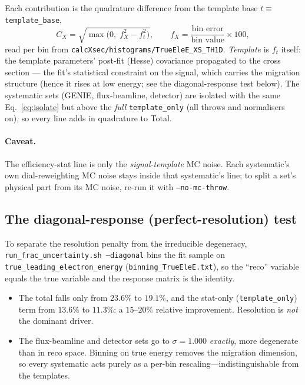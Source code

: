 \documentclass[11pt]{article}
\newcommand{\code}[1]{\texttt{#1}}
\begin{document}
Each contribution is the quadrature difference from the template base
$t \equiv$ \code{template\_base},
\begin{equation}
  C_X = \sqrt{\max\!\big(0,\; f_X^2 - f_t^2\big)},
  \qquad f_X = \frac{\text{bin error}}{\text{bin value}}\times 100,
  \label{eq:isolate}
\end{equation}
read per bin from \code{calcXsec/histograms/TrueEleE\_XS\_TH1D}. \emph{Template}
is $f_t$ itself: the template parameters' post-fit (Hesse) covariance propagated
to the cross section --- the fit's statistical constraint on the signal, which
carries the migration structure (hence it rises at low energy; see the
diagonal-response test below). The systematic sets (GENIE, flux-beamline,
detector) are isolated with the same Eq.~\eqref{eq:isolate} but above the
\emph{full} \code{template\_only} (all throws and normalisers on), so every line
adds in quadrature to Total.

\paragraph{Caveat.} The efficiency-stat line is only the \emph{signal-template}
MC noise. Each systematic's own dial-reweighting MC noise stays inside that
systematic's line; to split a set's physical part from its MC noise, re-run it
with \code{--no-mc-throw}.

\subsection{The diagonal-response (perfect-resolution) test}

To separate the resolution penalty from the irreducible degeneracy,
\code{run\_frac\_uncertainty.sh --diagonal} bins the fit sample on
\code{true\_leading\_electron\_energy} (\code{binning\_TrueEleE.txt}), so the
``reco'' variable equals the true variable and the response matrix is the
identity.

\begin{itemize}
  \item The total falls only from $23.6\%$ to $19.1\%$, and the stat-only
    (\code{template\_only}) term from $13.6\%$ to $11.3\%$: a $15$--$20\%$
    relative improvement. Resolution is \emph{not} the dominant driver.
  \item The flux-beamline and detector sets go to $\sigma=1.000$ \emph{exactly},
    more degenerate than in reco space. Binning on true energy removes the
    migration dimension, so every systematic acts purely as a per-bin
    rescaling---indistinguishable from the templates.
\end{itemize}
\end{document}

